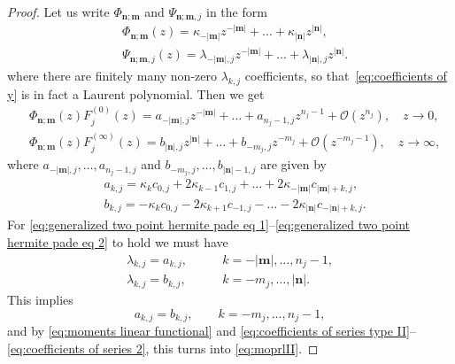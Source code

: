 \documentclass[reqno,centertags,11pt,draft]{amsart}
\newcommand{\abs}[1]{\left|#1\right|}
\begin{document}
\begin{proof}
    Let us write $\Phi_{\bm{n};\bm{m}}$ and $\Psi_{\bm{n};\bm{m},j}$ in the form
    \begin{align}\label{eq:coefficients of phi and psi}
        & \Phi_{\bm{n};\bm{m}}(z) =
        \kappa_{-\abs{\bm{m}}}z^{-\abs{\bm{m}}}+\dots + \kappa_{\abs{\bm{n}}}z^{\abs{\bm{n}}} , 
        \\ 
        \label{eq:coefficients of y}
        & \Psi_{\bm{n};\bm{m},j}(z) =
        \lambda_{-\abs{\bm{m}},j}z^{-\abs{\bm{m}}} + \dots +\lambda_{\abs{\bm{n}},j}z^{\abs{\bm{n}}}.
    \end{align}
    where there are finitely many non-zero $\lambda_{k,j}$ coefficients, so that~\eqref{eq:coefficients of y} is in fact a Laurent polynomial.
    Then we get
    \begin{align*}
        & \Phi_{\bm{n};\bm{m}}(z)F_j^{(0)}(z) = a_{-\abs{\bm{m}},j}z^{-\abs{\bm{m}}} + \dots + a_{n_j-1,j}z^{n_j-1} + \mathcal{O}(z^{n_j}), \quad z \rightarrow 0, \\
        & \Phi_{\bm{n};\bm{m}}(z)F_j^{(\infty)}(z) = b_{\abs{\bm{n}},j}z^{\abs{\bm{n}}} + \dots + b_{-m_j,j}z^{-m_j} + \mathcal{O}(z^{-m_j-1}), \quad z \rightarrow \infty,
    \end{align*}
    where $a_{-\abs{\bm{m}},j},\dots,a_{n_j-1,j}$ and $b_{-m_j,j},\dots,b_{\abs{\bm{n}}-1,j}$ are given by
    \begin{align}
        \label{eq:coefficients of series type II}
         & a_{k,j} = \kappa_kc_{0,j} + 2\kappa_{k-1}c_{1,j} + \dots + 2\kappa_{-\abs{\bm{m}}} c_{\abs{\bm{m}}+k,j},  %
         \\ 
         \label{eq:coefficients of series 2}
         & b_{k,j} = -\kappa_kc_{0,j} - 2\kappa_{k+1} c_{-1,j} - \dots - 2 \kappa_{\abs{\bm{n}}} c_{-\abs{\bm{n}}+k,j}.%
    \end{align}
    For \eqref{eq:generalized two point hermite pade eq 1}--\eqref{eq:generalized two point hermite pade eq 2} to hold we must have
    \begin{align}\label{eq:coefficients type II eq 1}
        \lambda_{k,j} = a_{k,j}, \qquad &k = -\abs{\bm{m}},\dots,n_j-1, \\\label{eq:coefficients type II eq 2}
        \lambda_{k,j} = b_{k,j}, \qquad &k = -m_j,\dots,\abs{\bm{n}}.
    \end{align}
    This implies 
    \begin{equation}
        a_{k,j} = b_{k,j}, \qquad k = -m_j,\dots,n_j-1,
    \end{equation}
    and by \eqref{eq:moments linear functional} and \eqref{eq:coefficients of series type II}--\eqref{eq:coefficients of series 2}, this turns into \eqref{eq:moprlII}. 
    

\end{proof}
\end{document}
